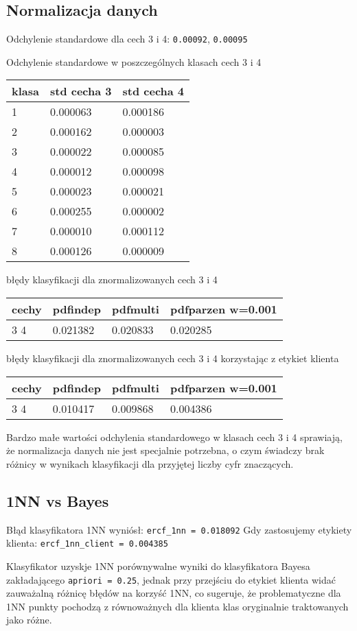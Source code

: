 \documentclass[11pt]{article}
\begin{document}
\subsection{Normalizacja danych}\label{normalizacja-danych}

Odchylenie standardowe dla cech 3 i 4: \texttt{0.00092},
\texttt{0.00095}

Odchylenie standardowe w poszczególnych klasach cech 3 i 4

\begin{longtable}[]{@{}lll@{}}
\toprule
klasa & std cecha 3 & std cecha 4\tabularnewline
\midrule
\endhead
1 & 0.000063 & 0.000186\tabularnewline
2 & 0.000162 & 0.000003\tabularnewline
3 & 0.000022 & 0.000085\tabularnewline
4 & 0.000012 & 0.000098\tabularnewline
5 & 0.000023 & 0.000021\tabularnewline
6 & 0.000255 & 0.000002\tabularnewline
7 & 0.000010 & 0.000112\tabularnewline
8 & 0.000126 & 0.000009\tabularnewline
\bottomrule
\end{longtable}

błędy klasyfikacji dla znormalizowanych cech 3 i 4

\begin{longtable}[]{@{}llll@{}}
\toprule
cechy & pdfindep & pdfmulti & pdfparzen w=0.001\tabularnewline
\midrule
\endhead
3 4 & 0.021382 & 0.020833 & 0.020285\tabularnewline
\bottomrule
\end{longtable}

błędy klasyfikacji dla znormalizowanych cech 3 i 4 korzystając z etykiet
klienta

\begin{longtable}[]{@{}llll@{}}
\toprule
cechy & pdfindep & pdfmulti & pdfparzen w=0.001\tabularnewline
\midrule
\endhead
3 4 & 0.010417 & 0.009868 & 0.004386\tabularnewline
\bottomrule
\end{longtable}

Bardzo małe wartości odchylenia standardowego w klasach cech 3 i 4
sprawiają, że normalizacja danych nie jest specjalnie potrzebna, o czym
świadczy brak różnicy w wynikach klasyfikacji dla przyjętej liczby cyfr
znaczących.

\subsection{1NN vs Bayes}\label{nn-vs-bayes}

Błąd klasyfikatora 1NN wyniósł: \texttt{ercf\_1nn\ =\ 0.018092} Gdy
zastosujemy etykiety klienta: \texttt{ercf\_1nn\_client\ =\ 0.004385}

Klasyfikator uzyskje 1NN porównywalne wyniki do klasyfikatora Bayesa
zakładającego \texttt{apriori\ =\ 0.25}, jednak przy przejściu do
etykiet klienta widać zauważalną różnicę błędów na korzyść 1NN, co
sugeruje, że problematyczne dla 1NN punkty pochodzą z równoważnych dla
klienta klas oryginalnie traktowanych jako różne.
\end{document}
